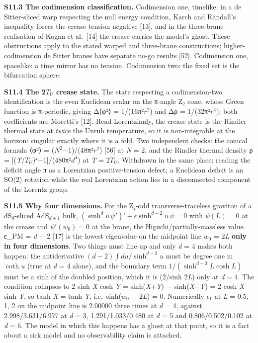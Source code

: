 \documentclass[
]{article}
\begin{document}
\textbf{S11.3 The codimension classification.} Codimension one,
timelike: in a de Sitter-sliced warp respecting the null energy
condition, Karch and Randall's inequality forces the crease tension
negative {[}13{]}, and in the three-brane realisation of Kogan et
al.~{[}14{]} the crease carries the model's ghost. These obstructions
apply to the stated warped and three-brane constructions;
higher-codimension de Sitter branes have separate no-go results
{[}52{]}. Codimension one, spacelike: a time mirror has no tension.
Codimension two: the fixed set is the bifurcation sphere.

\textbf{S11.4 The 2\(T_{U}\) crease state.} The state respecting a
codimension-two identification is the even Euclidean scalar on the
π-angle Z₂ cone, whose Green function is π-periodic, giving Δ⟨φ²⟩ =
1/(16π²\(r^2\)) and Δρ = 1/(32π²\(r^4\)); both coefficients are
Moretti's {[}12{]}. Read Lorentzianly, the crease state is the Rindler
thermal state at \emph{twice} the Unruh temperature, so it is
non-integrable at the horizon: singular exactly where it is a fold. Two
independent checks: the conical formula ⟨φ²⟩ = (\(N^2\)−1)/(48π²\(r^2\))
{[}56{]} at \emph{N} = 2, and the Rindler thermal density ρ =
{[}(\emph{T}/\(T_{U}\))⁴−1{]}/(480π²\(d^4\)) at \emph{T} = 2\(T_{U}\).
Withdrawn in the same place: reading the deficit angle π as a Lorentzian
positive-tension defect; a Euclidean deficit is an SO(2) rotation while
the real Lorentzian action lies in a disconnected component of the
Lorentz group.

\textbf{S11.5 Why four dimensions.} For the Z₂-odd transverse-traceless
graviton of a \(\mathrm{dS}_d\)-sliced \(\mathrm{AdS}_{d+1}\) bulk,
\((\sinh^d u\,\psi')'+\epsilon\sinh^{d-2}u\,\psi=0\) with \(\psi(L)=0\)
at the crease and \(\psi'(w_0)=0\) at the brane, the
Higuchi/partially-massless value ε\_PM = \emph{d} − 2 {[}17{]} is the
lowest eigenvalue on the midpoint line \(w_0\) = 2\emph{L} \textbf{only
in four dimensions}. Two things must line up and only \emph{d} = 4 makes
both happen: the antiderivative \((d-2)\int du/\sinh^{d-2}u\) must be
degree one in \(\coth u\) (true at \emph{d} = 4 alone), and the boundary
term \(1/(\sinh^{d-3}L\cosh L)\) must be a sinh of the doubled position,
which it is (2/sinh 2\emph{L}) only at \emph{d} = 4. The condition
collapses to 2 sinh \emph{X} cosh \emph{Y} = sinh(\emph{X}+\emph{Y}) −
sinh(\emph{X}−\emph{Y}) = 2 cosh \emph{X} sinh \emph{Y}, so tanh
\emph{X} = tanh \emph{Y}, i.e.~sinh(\(w_0\) − 2\emph{L}) = 0.
Numerically \(\epsilon_1\) at \emph{L} = 0.5, 1, 2 on the midpoint line
is 2.00000 three times at \emph{d} = 4, against 2.998/3.631/6.977 at
\emph{d} = 3, 1.291/1.033/0.480 at \emph{d} = 5 and 0.806/0.502/0.102 at
\emph{d} = 6. The model in which this happens has a ghost at that point,
so it is a fact about a sick model and no observability claim is
attached.
\end{document}
